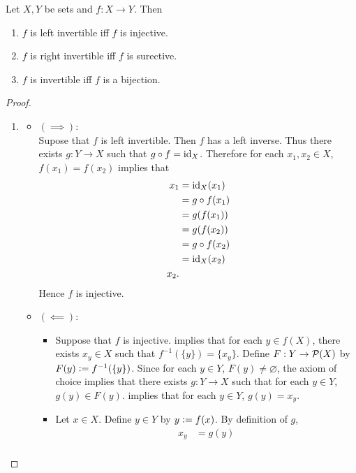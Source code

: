 \documentclass{book}
\begin{document}
	\begin{ex}
		Let $X,Y$ be sets and $f:X \rightarrow Y$. Then 
		\begin{enumerate}
			\item $f$ is left invertible iff $f$ is injective.
			\item $f$ is right invertible iff $f$ is surective.
			\item $f$ is invertible iff $f$ is a bijection.
		\end{enumerate}
	\end{ex}
	
	\begin{proof}\
		\begin{enumerate}
			\item 
			\begin{itemize}
				\item $(\implies)$: \\
				Supose that $f$ is left invertible. Then $f$ has a left inverse. Thus there exists $g:Y \rightarrow X$ such that $g \circ f = \operatorname{id}_X$. Therefore for each $x_1, x_2 \in X$, $f(x_1) = f(x_2)$ implies that 
				\begin{align*}
					x_1
					& = \operatorname{id}_X(x_1) \\
					& = g \circ f(x_1) \\
					& = g(f(x_1)) \\
					& = g(f(x_2)) \\
					& = g \circ f(x_2) \\
					& = \operatorname{id}_X(x_2) \\
					x_2.
				\end{align*}
				Hence $f$ is injective.
				\item $(\impliedby)$: \\
				\begin{itemize}
					\item Suppose that $f$ is injective. \rex{}  implies that for each $y \in f(X)$, there exists $x_y \in X$ such that $f^{-1}(\{y\}) = \{x_y\}$. Define $F:Y \rightarrow \mathcal{P}(X)$ by $F(y) \vcentcolon= f^{-1}(\{y\})$. Since for each $y \in Y$, $F(y) \neq \varnothing$, the axiom of choice  implies that there exists $g:Y \rightarrow X$ such that for each $y \in Y$, $g(y) \in F(y)$. \rex{}  implies that for each $y \in Y$, $g(y) = x_y$. 
					\item Let $x \in X$. Define $y \in Y$ by $y \vcentcolon= f(x)$. By definition of $g$, 
					\begin{align*}
						x_y
						& = g(y) \\

\end{align*}
\end{itemize}
\end{itemize}
\end{enumerate}
\end{proof}
\end{document}
